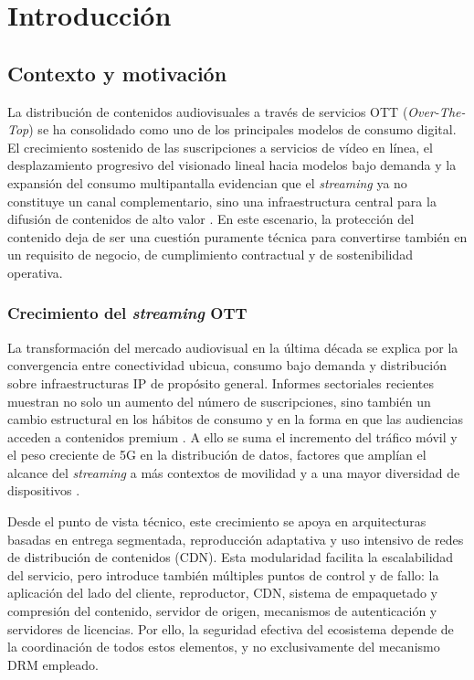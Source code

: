 
\chapter{Introducción}

\section{Contexto y motivación}

La distribución de contenidos audiovisuales a través de servicios OTT (\textit{Over-The-Top}) se ha consolidado como uno de los principales modelos de consumo digital. El crecimiento sostenido de las suscripciones a servicios de vídeo en línea, el desplazamiento progresivo del visionado lineal hacia modelos bajo demanda y la expansión del consumo multipantalla evidencian que el \textit{streaming} ya no constituye un canal complementario, sino una infraestructura central para la difusión de contenidos de alto valor \cite{mpa2021theme,ofcom2025,ericsson2025}. En este escenario, la protección del contenido deja de ser una cuestión puramente técnica para convertirse también en un requisito de negocio, de cumplimiento contractual y de sostenibilidad operativa.

\subsection{Crecimiento del \textit{streaming} OTT}

La transformación del mercado audiovisual en la última década se explica por la convergencia entre conectividad ubicua, consumo bajo demanda y distribución sobre infraestructuras IP de propósito general. Informes sectoriales recientes muestran no solo un aumento del número de suscripciones, sino también un cambio estructural en los hábitos de consumo y en la forma en que las audiencias acceden a contenidos premium \cite{mpa2021theme,ofcom2025}. A ello se suma el incremento del tráfico móvil y el peso creciente de 5G en la distribución de datos, factores que amplían el alcance del \textit{streaming} a más contextos de movilidad y a una mayor diversidad de dispositivos \cite{ericsson2025}.

Desde el punto de vista técnico, este crecimiento se apoya en arquitecturas basadas en entrega segmentada, reproducción adaptativa y uso intensivo de redes de distribución de contenidos (CDN). Esta modularidad facilita la escalabilidad del servicio, pero introduce también múltiples puntos de control y de fallo: la aplicación del lado del cliente, reproductor, CDN, sistema de empaquetado y compresión del contenido, servidor de origen, mecanismos de autenticación y servidores de licencias. Por ello, la seguridad efectiva del ecosistema depende de la coordinación de todos estos elementos, y no exclusivamente del mecanismo DRM empleado.

